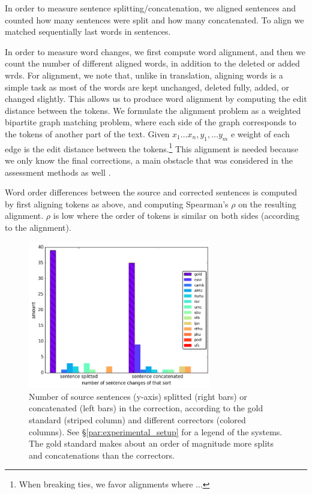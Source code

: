 \documentclass[english]{article}
\begin{document}
In order to measure sentence splitting/concatenation, we aligned sentences and counted how
many sentences were split and how many concatenated. To align we matched sequentially last
words in sentences.

In order to measure word changes, we first compute word alignment,
and then we count the number of different aligned words,
in addition to the deleted or added wrds.
For alignment, we note that, unlike in translation,
aligning words is a simple task as most of the words are kept unchanged,
deleted fully, added, or changed slightly. This allows us to
produce word alignment by computing the edit distance between the tokens.
We formulate the alignment problem as a weighted bipartite graph matching problem,
where each side of the graph corresponds to the tokens of another part of the text.
Given $x_1\ldots x_n,y_1,\ldots y_m$ e weight of each edge is the edit distance between the tokens.\footnote{When breaking ties, we favor alignments where ...}
This alignment is needed because we only know the final corrections,
a main obstacle that was considered in the assessment methods as well
\cite{dahlmeier2012better}.

Word order differences between the source and corrected sentences is
computed by first aligning tokens as above, and computing Spearman's $\rho$ on the resulting alignment.
$\rho$ is low where the order of tokens is similar on both sides (according to the alignment).


\begin{figure}
	\includegraphics[width = 8cm]{aligned}
	\caption{Number of source sentences (y-axis) splitted (right bars) or concatenated (left bars) in the correction,
          according to
          the gold standard (striped column) and different correctors (colored columns). See \S\ref{par:experimental_setup} for a legend
          of the systems. The gold standard makes about an order of magnitude more splits and
          concatenations than the correctors.}
	\label{fig:split}
\end{figure}
\end{document}
